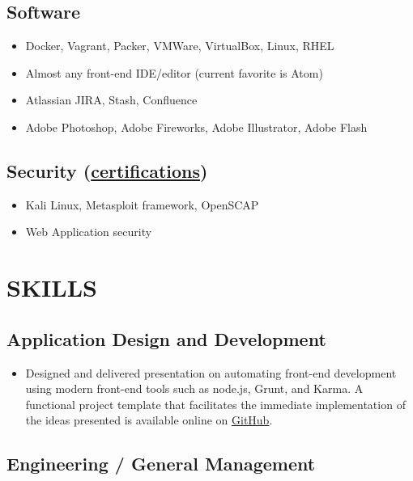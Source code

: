 \documentclass[10pt]{article}
\begin{document}
\subsection{Software}\label{software}

\begin{itemize}
\itemsep1pt\parskip0pt
\item
  Docker, Vagrant, Packer, VMWare, VirtualBox, Linux, RHEL
\item
  Almost any front-end IDE/editor (current favorite is Atom)
\item
  Atlassian JIRA, Stash, Confluence
\item
  Adobe Photoshop, Adobe Fireworks, Adobe Illustrator, Adobe Flash
\end{itemize}

\subsection{Security
(\hyperref[certifications]{certifications})}\label{security-certifications}

\begin{itemize}
\itemsep1pt\parskip0pt
\item
  Kali Linux, Metasploit framework, OpenSCAP
\item
  Web Application security
\end{itemize}

\section{SKILLS}\label{skills}

\subsection{Application Design and
Development}\label{application-design-and-development}

\begin{itemize}
\itemsep1pt\parskip0pt
\item
  Designed and delivered presentation on automating front-end
  development using modern front-end tools such as node.js, Grunt, and
  Karma. A functional project template that facilitates the immediate
  implementation of the ideas presented is available online on
  \href{https://github.com/jhwohlgemuth/generator-techtonic}{GitHub}.
\end{itemize}

\subsection{Engineering / General
Management}\label{engineering-general-management}
\end{document}
